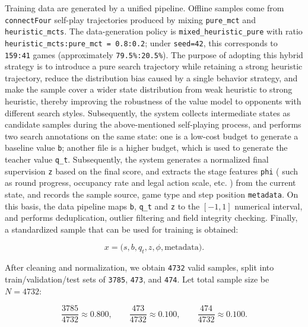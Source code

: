 Training data are generated by a unified pipeline. Offline samples come from \texttt{connectFour} self-play trajectories produced by mixing \texttt{pure_mct} and \texttt{heuristic_mcts}. The data-generation policy is \texttt{mixed_heuristic_pure} with ratio \texttt{heuristic_mcts:pure_mct = 0.8:0.2}; under \texttt{seed=42}, this corresponds to \texttt{159:41} games (approximately \texttt{79.5\%:20.5\%}). 
The purpose of adopting this hybrid strategy is to introduce a pure search trajectory while retaining a strong heuristic trajectory, reduce the distribution bias caused by a single behavior strategy, and make the sample cover a wider state distribution from weak heuristic to strong heuristic, thereby improving the robustness of the value model to opponents with different search styles. Subsequently, the system collects intermediate states as candidate samples during the above-mentioned self-playing process, and performs two search annotations on the same state: one is a low-cost budget to generate a baseline value \texttt{b}; another file is a higher budget, which is used to generate the teacher value \texttt{q_t}. Subsequently, the system generates a normalized final supervision \texttt{z} based on the final score, and extracts the stage features \texttt{phi} ( such as round progress, occupancy rate and legal action scale, etc. ) from the current state, and records the sample source, game type and step position \texttt{metadata}. On this basis, the data pipeline maps \texttt{b}, \texttt{q_t} and \texttt{z} to the $[-1,1]$ numerical interval, and performs deduplication, outlier filtering and field integrity checking. Finally, a standardized sample that can be used for training is obtained:

\begin{equation}
x=\bigl(s,b,q_t,z,\phi,\text{metadata}\bigr).
\end{equation}






After cleaning and normalization, we obtain \texttt{4732} valid samples, split into train/validation/test sets of \texttt{3785}, \texttt{473}, and \texttt{474}. Let total sample size be $N=4732$:

\begin{equation}
\frac{3785}{4732}\approx 0.800,\qquad
\frac{473}{4732}\approx 0.100,\qquad
\frac{474}{4732}\approx 0.100.
\end{equation}



